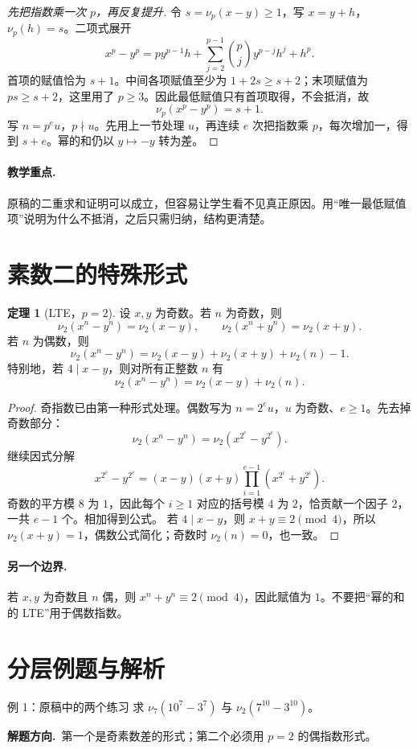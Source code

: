 \documentclass[UTF8,a4paper,11pt,oneside,openany,fontset=fandol]{ctexbook}
\theoremstyle{definition}
\newtheorem{theorem}[definition]{定理}
\newcommand{\hint}{\par\noindent\textbf{解题方向.}\ }
\begin{document}
\begin{proof}[先把指数乘一次 $p$，再反复提升]
令 $s=\nu_p(x-y)\ge1$，写 $x=y+h$，$\nu_p(h)=s$。二项式展开
\[
 x^p-y^p=py^{p-1}h+\sum_{j=2}^{p-1}\binom pj y^{p-j}h^j+h^p.
\]
首项的赋值恰为 $s+1$。中间各项赋值至少为 $1+2s\ge s+2$；末项赋值为 $ps\ge s+2$，这里用了 $p\ge3$。因此最低赋值只有首项取得，不会抵消，故
\[
\nu_p(x^p-y^p)=s+1.
\]
写 $n=p^e u$，$p\nmid u$。先用上一节处理 $u$，再连续 $e$ 次把指数乘 $p$，每次增加一，得到 $s+e$。幂的和仍以 $y\mapsto-y$ 转为差。
\end{proof}
\paragraph{教学重点.} 原稿的二重求和证明可以成立，但容易让学生看不见真正原因。用“唯一最低赋值项”说明为什么不抵消，之后只需归纳，结构更清楚。


\section{素数二的特殊形式}
\begin{theorem}[LTE，$p=2$]
设 $x,y$ 为奇数。若 $n$ 为奇数，则
\[
 \nu_2(x^n-y^n)=\nu_2(x-y),\qquad
 \nu_2(x^n+y^n)=\nu_2(x+y).
\]
若 $n$ 为偶数，则
\[
 \nu_2(x^n-y^n)=\nu_2(x-y)+\nu_2(x+y)+\nu_2(n)-1.
\]
特别地，若 $4\mid x-y$，则对所有正整数 $n$ 有
\[
 \nu_2(x^n-y^n)=\nu_2(x-y)+\nu_2(n).
\]
\end{theorem}

\begin{proof}
奇指数已由第一种形式处理。偶数写为 $n=2^e u$，$u$ 为奇数、$e\ge1$。先去掉奇数部分：
\[
\nu_2(x^n-y^n)=\nu_2(x^{2^e}-y^{2^e}).
\]
继续因式分解
\[
 x^{2^e}-y^{2^e}=(x-y)(x+y)\prod_{i=1}^{e-1}(x^{2^i}+y^{2^i}).
\]
奇数的平方模 $8$ 为 $1$，因此每个 $i\ge1$ 对应的括号模 $4$ 为 $2$，恰贡献一个因子 $2$，一共 $e-1$ 个。相加得到公式。
若 $4\mid x-y$，则 $x+y\equiv2\pmod4$，所以 $\nu_2(x+y)=1$，偶数公式简化；奇数时 $\nu_2(n)=0$，也一致。
\end{proof}
\paragraph{另一个边界.} 若 $x,y$ 为奇数且 $n$ 偶，则 $x^n+y^n\equiv2\pmod4$，因此赋值为 $1$。不要把“幂的和的 LTE”用于偶数指数。


\section{分层例题与解析}
\begin{problem}{例 1：原稿中的两个练习}
求 $\nu_7(10^7-3^7)$ 与 $\nu_2(7^{10}-3^{10})$。
\end{problem}
\hint 第一个是奇素数差的形式；第二个必须用 $p=2$ 的偶指数形式。
\end{document}
